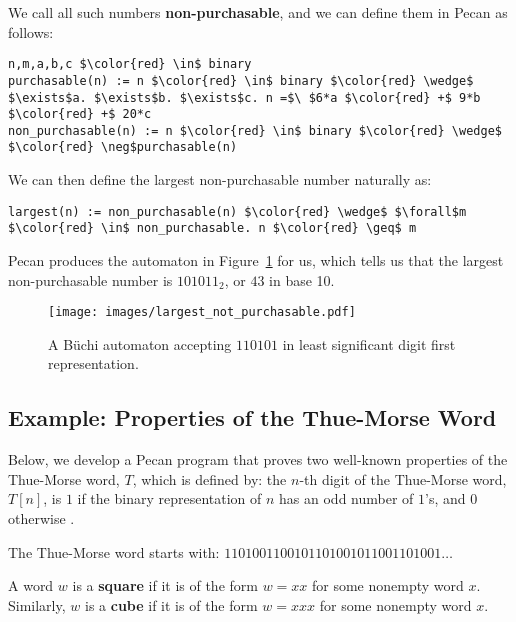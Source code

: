 \documentclass[10pt,usenames,dvipsnames]{article}
\begin{document}
We call all such numbers \textbf{non-purchasable}, and we can define them in Pecan as follows:

\begin{lstlisting}[language=pecan, basicstyle=\normalsize\ttfamily, mathescape=true, frame=single]
n,m,a,b,c $\color{red} \in$ binary
purchasable(n) := n $\color{red} \in$ binary $\color{red} \wedge$ $\exists$a. $\exists$b. $\exists$c. n =$\ $6*a $\color{red} +$ 9*b $\color{red} +$ 20*c
non_purchasable(n) := n $\color{red} \in$ binary $\color{red} \wedge$ $\color{red} \neg$purchasable(n)
\end{lstlisting}

We can then define the largest non-purchasable number naturally as:
\begin{lstlisting}[language=pecan, basicstyle=\normalsize\ttfamily, mathescape=true, frame=single]
largest(n) := non_purchasable(n) $\color{red} \wedge$ $\forall$m $\color{red} \in$ non_purchasable. n $\color{red} \geq$ m
\end{lstlisting}

Pecan produces the automaton in Figure~\ref{fig:largest_non_purchasable} for us, which tells us that the largest non-purchasable number is $101011_2$, or $43$ in base 10.

\begin{figure}
    \centering
    \texttt{[image: images/largest\_not\_purchasable.pdf]}
    \caption{A B\"uchi automaton accepting $110101$ in least significant digit first representation.}
    \label{fig:largest_non_purchasable}
\end{figure}

\subsection*{Example: Properties of the Thue-Morse Word}

Below, we develop a Pecan program that proves two well-known properties of the Thue-Morse word, $T$, which is defined by: the $n$-th digit of the Thue-Morse word, $T[n]$, is $1$ if the binary representation of $n$ has an odd number of $1$'s, and $0$ otherwise \cite{auto_seq}.

The Thue-Morse word starts with: $1101001100101101001011001101001\ldots$
\begin{definition}
    A word $w$ is a \textbf{square} if it is of the form $w = xx$ for some nonempty word $x$.
    Similarly, $w$ is a \textbf{cube} if it is of the form $w = xxx$ for some nonempty word $x$.
\end{definition}
\end{document}

